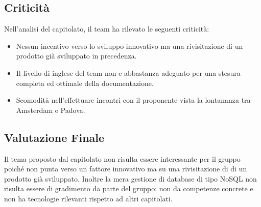 \subsection{Criticità}
Nell'analisi del capitolato, il team ha rilevato le seguenti criticità:
\begin{itemize}
	\item Nessun incentivo verso lo sviluppo innovativo ma una rivisitazione di un prodotto già sviluppato in precedenza. 
	\item Il livello di inglese del team non e abbastanza adeguato per una stesura completa ed ottimale della documentazione. 	
	\item Scomodità nell'effettuare incontri con il proponente vista la lontananza tra Amsterdam e Padova.
\end{itemize}

\subsection{Valutazione Finale}
Il tema proposto dal capitolato non risulta essere interessante per il gruppo poiché non punta verso un fattore innovativo ma su una rivisitazione di di un prodotto già sviluppato.
Inoltre la mera gestione di database di tipo NoSQL non risulta essere di gradimento da parte del gruppo: non da competenze concrete e non ha tecnologie rilevanti rispetto ad altri capitolati. 

